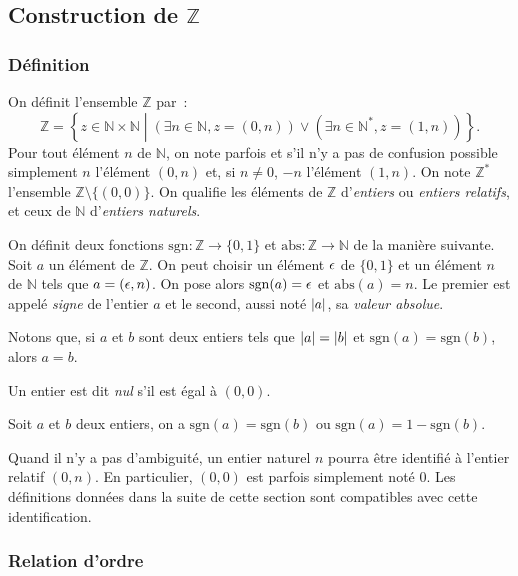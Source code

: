 \subsection{Construction de \texorpdfstring{$\mathbb{Z}$}{Z}}

\subsubsection{Définition}

On définit l'ensemble $\mathbb{Z}$ par : 
\begin{equation*}
    \mathbb{Z} = \left\lbrace z \in \mathbb{N} \times \mathbb{N} \middle\vert (\exists n \in \mathbb{N}, z = (0,n)) \vee (\exists n \in \mathbb{N}^*, z = (1,n)) \right\rbrace.
\end{equation*}
Pour tout élément $n$ de $\mathbb{N}$, on note parfois et s'il n'y a pas de confusion possible simplement $n$ l'élément $(0,n)$ et, si $n \neq 0$, $-n$ l'élément $(1,n)$.
On note $\mathbb{Z}^*$ l'ensemble $\mathbb{Z} \setminus \lbrace (0,0) \rbrace$.
On qualifie les éléments de $\mathbb{Z}$ d'\textit{entiers} ou \textit{entiers relatifs}, et ceux de $\mathbb{N}$ d'\textit{entiers naturels}. 

On définit deux fonctions $\mathrm{sgn}: \mathbb{Z} \to \lbrace 0, 1 \rbrace$ et $\mathrm{abs}: \mathbb{Z} \to \mathbb{N}$ de la manière suivante. 
Soit $a$ un élément de $\mathbb{Z}$. 
On peut choisir un élément $\epsilon$ de $\lbrace 0, 1 \rbrace$ et un élément $n$ de $\mathbb{N}$ tels que $a = (\epsilon,n)$. 
On pose alors $\mathrm{sgn}(a) = \epsilon$ et $\mathrm{abs}(a) = n$. 
Le premier est appelé \textit{signe} de l'entier $a$ et le second, aussi noté $\left\lvert a \right\rvert$, sa \textit{valeur absolue}. 

Notons que, si $a$ et $b$ sont deux entiers tels que $\left\lvert a \right\rvert = \left\lvert b \right\rvert$ et $\mathrm{sgn}(a) = \mathrm{sgn}(b)$, alors $a = b$. 

Un entier est dit \textit{nul} s'il est égal à $(0,0)$.

Soit $a$ et $b$ deux entiers, on a $\mathrm{sgn}(a) = \mathrm{sgn}(b)$ ou $\mathrm{sgn}(a) = 1 - \mathrm{sgn}(b)$.

Quand il n'y a pas d'ambiguité, un entier naturel $n$ pourra être identifié à l'entier relatif $(0,n)$. 
En particulier, $(0,0)$ est parfois simplement noté $0$.
Les définitions données dans la suite de cette section sont compatibles avec cette identification.

\subsubsection{Relation d'ordre}

